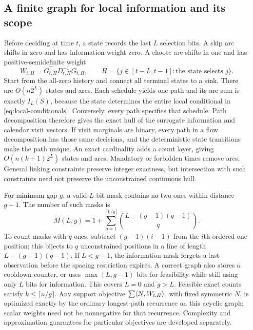 \subsection{A finite graph for local information and its scope}
\label{subsec:calendar-graph}
Before deciding at time $t$, a state records the last $L$ selection bits.
A skip arc shifts in zero and has information weight zero. A choose arc
shifts in one and has positive-semidefinite weight
\begin{equation}
 W_{t,H}=G_{t,H}^\top D_{t,H}^{-1}G_{t,H},
 \qquad H=\{j\in[t-L,t-1]:\text{the state selects }j\}.
 \label{eq:calendar-arc}
\end{equation}
Start from the all-zero history and connect all terminal states to a sink.
There are $O(n2^L)$ states and arcs. Each schedule yields one path and
its arc sum is exactly $I_L(S)$, because the state determines the entire
local conditional in \eqref{eq:local-conditionals}. Conversely, every path
specifies that schedule. Path decomposition therefore gives the exact hull
of the surrogate information and calendar visit vectors. If visit marginals
are binary, every path in a flow decomposition has those same decisions,
and the deterministic state transitions make the path unique.
An exact cardinality adds a count layer, giving
$O(n(k+1)2^L)$ states and arcs. Mandatory or forbidden times remove arcs.
General linking constraints preserve integer exactness, but intersection
with such constraints need not preserve the unconstrained continuous hull.

For minimum gap $g$, a valid $L$-bit mask contains no two ones within
distance $g-1$. The number of such masks is
\begin{equation}
 M(L,g)=1+\sum_{q=1}^{\lceil L/g\rceil}
             \binom{L-(g-1)(q-1)}{q}.
 \label{eq:separated-mask-count}
\end{equation}
To count masks with $q$ ones, subtract $(g-1)(i-1)$ from the $i$th ordered
one-position; this bijects to $q$ unconstrained positions in a line of
length $L-(g-1)(q-1)$. If $L<g-1$, the information mask forgets a last
observation before the spacing restriction expires. A correct graph also
stores a cooldown counter, or uses $\max(L,g-1)$ bits for feasibility
while still using only $L$ bits for information. This covers $L=0$ and
$g>L$. Feasible exact counts satisfy $k\le\lceil n/g\rceil$.
Any support objective $\sum\langle N,W_{t,H}\rangle$, with fixed symmetric $N$,
is optimized exactly by the ordinary longest-path recurrence on this acyclic
graph; scalar weights need not be nonnegative for that recurrence. Complexity
and approximation guarantees for particular objectives are developed separately.

